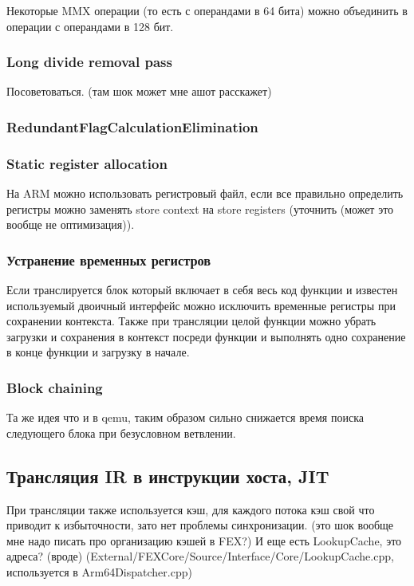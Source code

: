 Некоторые MMX операции (то есть с операндами в 64 бита) можно объединить в операции с операндами в 128 бит.

\subsubsection{Long divide removal pass}
Посоветоваться. (там шок может мне ашот расскажет)

\subsubsection{RedundantFlagCalculationElimination}

\subsubsection{Static register allocation}
На ARM можно использовать регистровый файл, если все правильно определить регистры можно заменять store context на store registers (уточнить (может это вообще не оптимизация)).

\subsubsection{Устранение временных регистров}
Если транслируется блок который включает в себя весь код функции и известен используемый двоичный интерфейс можно исключить временные регистры при сохранении контекста. Также при трансляции целой функции можно убрать загрузки и сохранения в контекст посреди функции и выполнять одно сохранение в конце функции и загрузку в начале.

\subsubsection{Block chaining}
Та же идея что и в qemu, таким образом сильно снижается время поиска следующего блока при безусловном ветвлении.

\subsection{Трансляция IR в инструкции хоста, JIT}

При трансляции также используется кэш, для каждого потока кэш свой что приводит к избыточности, зато нет проблемы синхронизации. (это шок вообще мне надо писать про организацию кэшей в FEX?)
И еще есть LookupCache, это адреса? (вроде)
(External/FEXCore/Source/Interface/Core/LookupCache.cpp, используется в Arm64Dispatcher.cpp)

